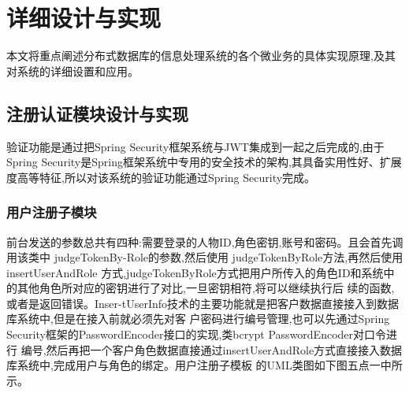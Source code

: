 \chapter{详细设计与实现}

本文将重点阐述分布式数据库的信息处理系统的各个微业务的具体实现原理,及其对系统的详细设置和应用。

\section{注册认证模块设计与实现}

验证功能是通过把Spring Security框架系统与JWT集成到一起之后完成的,由于Spring Security是Spring框架系统中专用的安全技术的架构,其具备实用性好、扩展度高等特征,所以对该系统的验证功能通过Spring Security完成。

\subsection{用户注册子模块}


前台发送的参数总共有四种:需要登录的人物ID,角色密钥,账号和密码。且会首先调用该类中 judgeTokenBy-Role的参数,然后使用
judgeTokenByRole方法,再然后使用insertUserAndRole
方式,judgeTokenByRole方式把用户所传入的角色ID和系统中的其他角色所对应的密钥进行了对比,一旦密钥相符,将可以继续执行后
续的函数,或者是返回错误。Inser-tUserInfo技术的主要功能就是把客户数据直接接入到数据库系统中,但是在接入前就必须先对客
户密码进行编号管理,也可以先通过Spring Security框架的PasswordEncoder接口的实现,类bcrypt PasswordEncoder对口令进行
编号,然后再把一个客户角色数据直接通过insertUserAndRole方式直接接入数据库系统中,完成用户与角色的绑定。用户注册子模板
的UML类图如下图五点一中所示。

